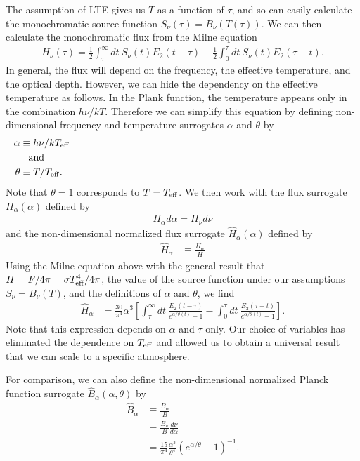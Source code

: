 The assumption of LTE gives us $T$ as a function of $\tau$,
and so can easily calculate the monochromatic source
function $S_\nu(\tau) = B_\nu(T(\tau))$. We can then
calculate the monochromatic flux from the Milne equation
\begin{align}
H_\nu(\tau) = 
 \frac{1}{2}\int_{\tau}^\infty\!\!\!dt\: S_\nu(t) E_2(t - \tau)
 - 
\frac{1}{2} \int_0^{\tau}\!dt\: S_\nu(t) E_2(\tau - t).
\end{align}
In general, the flux will depend on the frequency, the
effective temperature, and the optical depth. However, we
can hide the dependency on the effective temperature as
follows. In the Plank function, the temperature appears only
in the combination $h\nu/kT$. Therefore we can simplify this
equation by defining non-dimensional frequency and temperature surrogates $\alpha$ and $\theta$ by
\begin{align}
\alpha &\equiv h\nu/k\Teff\\
\noalign{and}
\theta &\equiv T/\Teff.
\end{align}
Note that $\theta = 1$ corresponds to $T = T_\mathrm{eff}$. We then work with the flux surrogate $H_\alpha(\alpha)$ defined by
\begin{align}
H_\alpha d\alpha = H_\nu d\nu
\end{align}
and the non-dimensional normalized flux surrogate $\hat H_\alpha(\alpha)$ defined by
\begin{align}
\hat H_\alpha 
&\equiv \frac{H_\alpha}{H}
\end{align}
Using the Milne equation above with the general result that $H = F/4\pi = \sigma T_\mathrm{eff}^4/4\pi$, the value of the source function under our assumptions $S_\nu = B_\nu(T)$, and the definitions of $\alpha$ and $\theta$, we find
\begin{align}
\hat H_\alpha 
&= \frac{30}{\pi^4} \alpha^3
\left[
\int_{\tau}^\infty\!\!\!dt\: 
\frac{E_2(t - \tau)}{e^{\alpha/\theta(t)} - 1}
 - 
\int_0^{\tau}\!dt\:  
\frac{E_2(\tau - t)}{e^{\alpha/\theta(t)} - 1}
\right].
\end{align}
Note that this expression depends on $\alpha$ and $\tau$ only. Our choice of variables has eliminated the dependence on $T_\mathrm{eff}$ and allowed us to obtain a universal result that we can scale to a specific atmosphere.

For comparison, we can also define the non-dimensional normalized Planck function surrogate $\hat B_\alpha(\alpha, \theta)$ by
\begin{align}
\hat B_\alpha &\equiv \frac{B_\alpha}{B}\\
&= \frac{B_\nu}{B}\frac{d\nu}{d\alpha}\\
&=\frac{15}{\pi^4}\frac{\alpha^3}{\theta^4}(e^{\alpha/\theta} -1)^{-1}.
\end{align}

